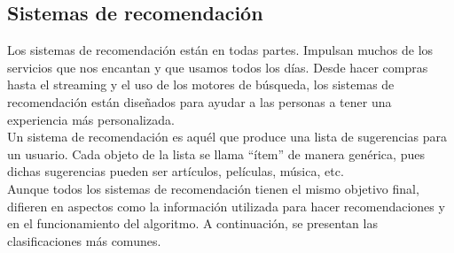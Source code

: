     \subsection{Sistemas de recomendación}
    Los sistemas de recomendación están en todas partes. Impulsan muchos de los servicios que nos encantan y que usamos todos los días. 
    Desde hacer compras hasta el streaming y el uso de los motores de búsqueda, los sistemas de recomendación están diseñados para 
    ayudar a las personas a tener una experiencia más personalizada.\\
    \newline
    Un sistema de recomendación es aquél que produce una lista de sugerencias para un usuario. Cada objeto de la lista se llama “ítem” 
    de manera genérica, pues dichas sugerencias pueden ser artículos, películas, música, etc.\\
    \newline
    Aunque todos los sistemas de recomendación tienen el mismo objetivo final, difieren en aspectos como la información utilizada para 
    hacer recomendaciones y en el funcionamiento del algoritmo. A continuación, se presentan las clasificaciones más comunes.
    
